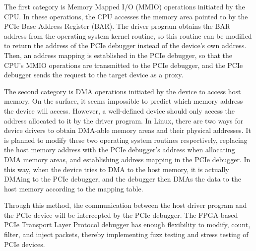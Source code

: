 The first category is Memory Mapped I/O (MMIO) operations initiated by the CPU. In these operations, the CPU accesses the memory area pointed to by the PCIe Base Address Register (BAR). The driver program obtains the BAR address from the operating system kernel routine, so this routine can be modified to return the address of the PCIe debugger instead of the device's own address. Then, an address mapping is established in the PCIe debugger, so that the CPU's MMIO operations are transmitted to the PCIe debugger, and the PCIe debugger sends the request to the target device as a proxy.

The second category is DMA operations initiated by the device to access host memory. On the surface, it seems impossible to predict which memory address the device will access. However, a well-defined device should only access the address allocated to it by the driver program. In Linux, there are two ways for device drivers to obtain DMA-able memory areas and their physical addresses. It is planned to modify these two operating system routines respectively, replacing the host memory address with the PCIe debugger's address when allocating DMA memory areas, and establishing address mapping in the PCIe debugger. In this way, when the device tries to DMA to the host memory, it is actually DMAing to the PCIe debugger, and the debugger then DMAs the data to the host memory according to the mapping table.

Through this method, the communication between the host driver program and the PCIe device will be intercepted by the PCIe debugger. The FPGA-based PCIe Transport Layer Protocol debugger has enough flexibility to modify, count, filter, and inject packets, thereby implementing fuzz testing and stress testing of PCIe devices.
\fi

